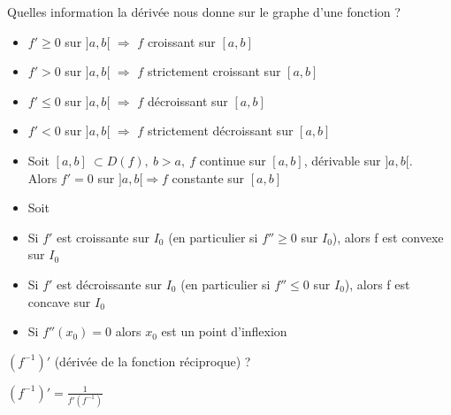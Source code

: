 \documentclass[12pt]{article}
\newcommand*{\xfield}[1]{\begin{mdframed}\centering #1\end{mdframed}\bigskip}
\newenvironment{note}{}{}
\begin{document}
\begin{note}
	\xfield{Quelles information la dérivée nous donne sur le graphe d'une fonction ?}
	\xfield{\begin{itemize}
		\item $f' \ge 0$ sur $]a,b[$ $\Rightarrow$ $f$ croissant sur $[a,b]$
		\item $f' > 0$ sur $]a,b[$ $\Rightarrow$ $f$ strictement croissant sur $[a,b]$
		\item $f' \le 0$ sur $]a,b[$ $\Rightarrow$ $f$ décroissant sur $[a,b]$
		\item $f' < 0$ sur $]a,b[$ $\Rightarrow$ $f$ strictement décroissant sur $[a,b]$
		\item Soit $[a,b]\ \subset D(f),\ b > a,\ f$ continue sur $[a,b]$, dérivable sur $]a,b[$.\\
		Alors $f'=0$ sur $]a,b[ \Rightarrow f$ constante sur $[a,b]$
		\item Soit 
		\item Si $f'$ est croissante sur $I_0$ (en particulier si $f'' \ge 0$ sur $I_0$), alors f est convexe sur $I_0$
		\item Si $f'$ est décroissante sur $I_0$ (en particulier si $f'' \le 0$ sur $I_0$), alors f est concave sur $I_0$ 
		\item Si $f''(x_0) = 0$ alors $x_0$ est un point d'inflexion
	\end{itemize} }
\end{note}

\begin{note}
	\xfield{$(f^{-1})'$ (dérivée de la fonction réciproque) ?}
	\xfield{$(f^{-1})' =  \frac{1}{f'(f^{-1})}$}
\end{note}
\end{document}
